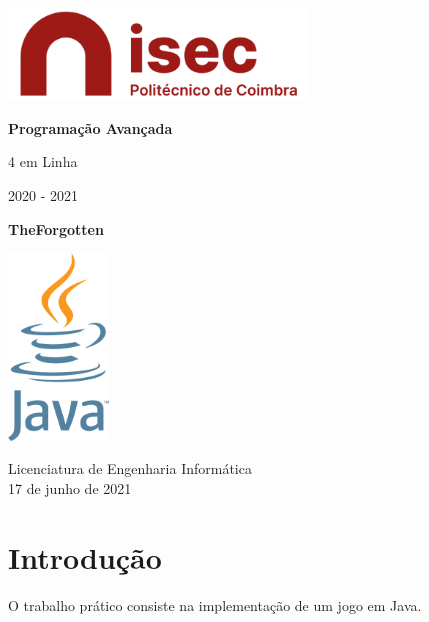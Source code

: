 \documentclass[11pt]{article}
\begin{document}
	\begin{titlepage}
    	\begin{center}
    		\includegraphics[width=0.6\textwidth]{logo-isec}
    		
    		\vspace*{\fill}
    		
    		\Huge
    		\textbf{Programação Avançada}
    		
    		\huge
    		4 em Linha
    		
    		\vspace{0.5cm}
    		\LARGE
    		2020 - 2021
    		
    		\vspace{1.5cm}
    		
    		\textbf{TheForgotten}
    		
    		\vspace*{\fill}
    		\includegraphics[width=0.2\textwidth]{logo-java}
    		
    		\vfill
    		\vspace*{\fill}
    		
    		\normalsize
    		Licenciatura de Engenharia Informática \\
    		17 de junho de 2021		
    	\end{center}
    \end{titlepage}
	
	\tableofcontents
	\pagebreak
	
	\large
	\section{Introdução}
	\normalsize
	
	O trabalho prático consiste na implementação de um jogo em Java.
	
\end{document}

